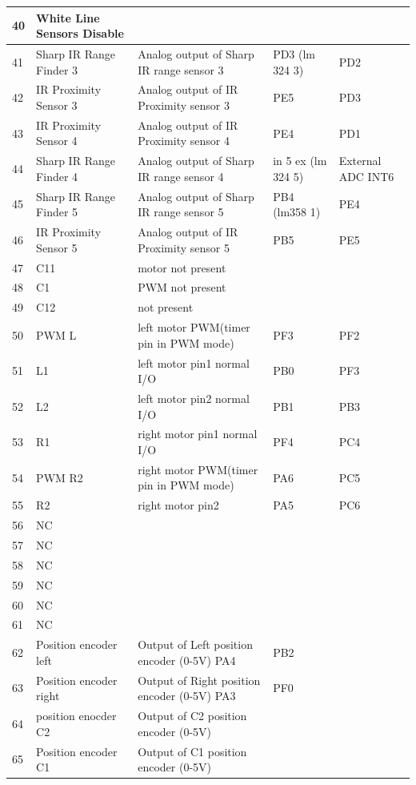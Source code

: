 \documentclass[a4paper,10pt,oneside]{article}
\begin{document}
{\begin{longtable}{|p{}|p{}|p{}|p{}|p{}|}
				40&	White Line Sensors Disable&& &\\ \hline		
				41&	Sharp IR Range Finder 3&	Analog output of Sharp IR range sensor 3	&PD3 (lm 324 3) & PD2\\ \hline
				42&	IR Proximity Sensor 3&	Analog output of IR Proximity sensor 3	&PE5 & PD3\\ \hline
				43&	IR Proximity Sensor 4&	Analog output of IR Proximity sensor 4&	PE4 & PD1\\ \hline
				44&	Sharp IR Range Finder 4	&Analog output of Sharp IR range sensor 4&	in 5 ex (lm 324 5) &	External ADC INT6\\ \hline
				45&	Sharp IR Range Finder 5&	Analog output of Sharp IR range sensor 5&	PB4 (lm358 1) & PE4\\ \hline
				46&	IR Proximity Sensor 5&	Analog output of IR Proximity sensor 5&	PB5 & PE5\\ \hline
				47&	C11& motor 	not present& &	\\ \hline
				48&	C1 &PWM	not present	& &\\ \hline
				49&	C12&	not present	& &\\ \hline
				50&	PWM L&	left motor PWM(timer pin in PWM mode)&	PF3 & PF2\\ \hline
				51&	L1&	left motor pin1 normal I/O&	PB0 & PF3\\ \hline
				52&	L2&	left motor pin2 normal I/O&	PB1 & PB3\\ \hline
				53&	R1&	right motor pin1 normal I/O&	PF4 & PC4\\ \hline
				54&	PWM R2&	right motor PWM(timer pin in PWM  mode)&	PA6 & PC5\\ \hline
				55&	R2&	right motor pin2&	PA5 & PC6\\ \hline
				56&	NC&&&	\\ \hline	
				57&	NC&&&	\\ \hline	
				58&	NC&&&	\\ \hline	
				59&	NC&&&	\\ \hline	
				60&	NC&&&	\\ \hline	
				61&	NC&&&	\\ \hline
				62&	Position encoder left&	Output of Left position encoder (0-5V)	PA4&PB2&\\ \hline
				63&	Position encoder right& 	Output of Right position encoder (0-5V)	PA3&PF0&\\ \hline
				64&	position enocder C2&	Output of C2 position encoder (0-5V)&&	\\ \hline
				65&	Position encoder C1& Output of C1 position encoder (0-5V)&&	\\ \hline

\end{longtable}}
\end{document}
